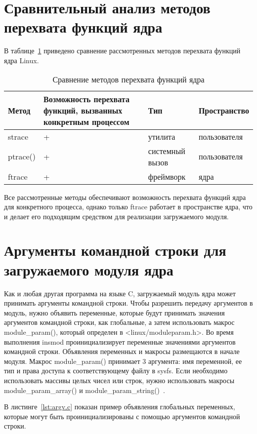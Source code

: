 \documentclass{bmstu}
\begin{document}
\pagebreak
\section{Сравнительный анализ методов перехвата функций ядра}

В таблице~\ref{tabular:comparison} приведено сравнение рассмотренных методов перехвата функций ядра Linux.

\begin{table}[H]
\caption{Сравнение методов перехвата функций ядра}
\label{tabular:comparison}
\begin{tabular}{|p{3cm}|p{4cm}|p{4cm}|p{4cm}|}
\hline
\textbf{Метод} & \textbf{Возможность перехвата функций, вызванных конкретным процессом} & \textbf{Тип} & \textbf{Пространство}
\tabularnewline
\hline
strace & + & утилита & пользователя
\tabularnewline
\hline
ptrace() & + & системный вызов & пользователя
\tabularnewline
\hline
ftrace & + & фреймворк & ядра
\tabularnewline
\hline
\end{tabular}
\end{table}

Все рассмотренные методы обеспечивают возможность перехвата функций ядра для конкретного процесса, однако только ftrace работает в пространстве ядра, что и делает его подходящим средством для реализации загружаемого модуля.

\section{Аргументы командной строки для загружаемого модуля ядра}

Как и любая другая программа на языке C, загружаемый модуль ядра может принимать аргументы командной строки. 
Чтобы разрешить передачу аргументов в модуль, нужно объявить переменные, которые будут принимать значения аргументов командной строки, как глобальные, а затем использовать макрос module\_param(), который определен в <linux/moduleparam.h>. 
Во время выполнения insmod проинициализирует переменные значениями аргументов командной строки. 
Объявления переменных и макросы размещаются в начале модуля. 
Макрос module\_param() принимает 3 аргумента: имя переменной, ее тип и права доступа к соответствующему файлу в sysfs. 
Если необходимо использовать массивы целых чисел или строк, нужно использовать макросы module\_param\_array() и module\_param\_string()~\cite{ArgvLkm}.

\pagebreak
В листинге~\ref{lst:argv.c} показан пример объявления глобальных переменных, которые могут быть проинициализированы с помощью аргументов командной строки.
\end{document}
